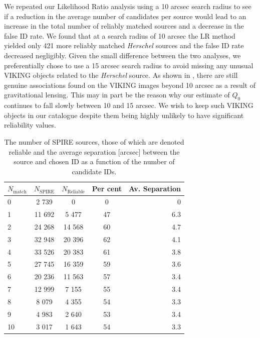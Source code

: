 \documentclass[fleqn,usenatbib]{mnras}
\begin{document}
We repeated our Likelihood Ratio analysis using a 10 arcsec search radius to see if a reduction in the average number of candidates per source would lead to an increase in the total number of reliably matched sources and a decrease in the false ID rate. We found that at a search radius of 10 arcsec the LR method yielded only 421 more reliably matched \textit{Herschel} sources and the false ID rate decreased negligibly. Given the small difference between the two analyses, we preferentially chose to use a 15 arcsec search radius to avoid missing any unusual VIKING objects related to the \textit{Herschel} source. As shown in \citealp{Bakx_2020}, there are still genuine associations found on the VIKING images beyond 10 arcsec as a result of gravitational lensing. This may in part be the reason why our estimate of $Q_0$ continues to fall slowly between 10 and 15 arcsec. We wish to keep such VIKING objects in our catalogue despite them being highly unlikely to have significant reliability values.

\begin{table}
	\centering
	\caption{The number of SPIRE sources, those of which are denoted reliable and the average separation [arcsec] between the source and chosen ID as a function of the number of candidate IDs.}
	\label{tab:multiplicity}
	\begin{tabular}{lcccr}
		\hline
		\hline
		$N_{\textrm{match}}$ & $N_{\textrm{SPIRE}}$ & $N_{\textrm{Reliable}}$ &
		Per cent & Av. Separation \\
		\hline
		0 & 2 739 & 0 & 0 & 0 \\
		1 & 11 692 & 5 477 & 47 & 6.3 \\
		2 & 24 268 & 14 568 & 60 & 4.7 \\
		3 & 32 948 & 20 396 & 62 & 4.1 \\
		4 & 33 526 & 20 383 & 61 & 3.8 \\
		5 & 27 745 & 16 359 & 59 & 3.6 \\
		6 & 20 236 & 11 563 & 57 & 3.4 \\
		7 & 12 999 & 7 155 & 55 & 3.4 \\
		8 & 8 079 & 4 355 & 54 & 3.3 \\
		9 & 4 983 & 2 640 & 53 & 3.4 \\
		10 & 3 017 & 1 643 & 54 & 3.3 \\
		\hline
		\hline
	\end{tabular}
\end{table}
\end{document}
